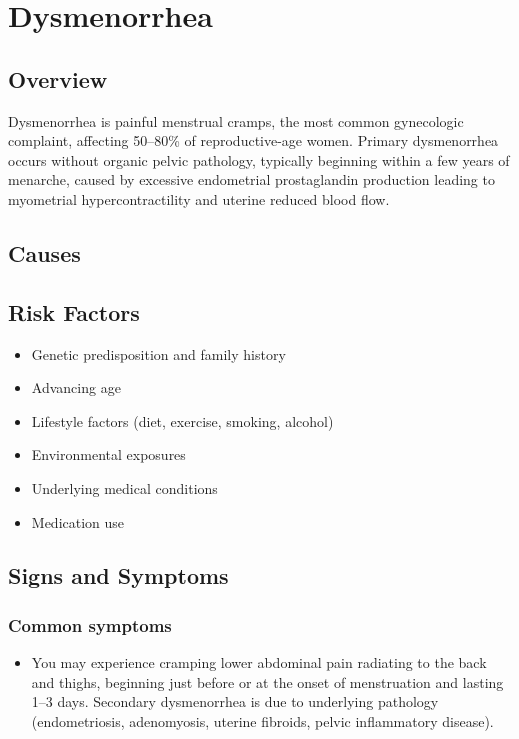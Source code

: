 \chapter{Dysmenorrhea}
\label{sec:Dysmenorrhea}

\section{Overview}
Dysmenorrhea is painful menstrual cramps, the most common gynecologic complaint, affecting 50--80\% of reproductive-age women. Primary dysmenorrhea occurs without organic pelvic pathology, typically beginning within a few years of menarche, caused by excessive endometrial prostaglandin production leading to myometrial hypercontractility and uterine reduced blood flow.
\section{Causes}
\section{Risk Factors}

\begin{itemize}[noitemsep]
  \item Genetic predisposition and family history
  \item Advancing age
  \item Lifestyle factors (diet, exercise, smoking, alcohol)
  \item Environmental exposures
  \item Underlying medical conditions
  \item Medication use
\end{itemize}
\section{Signs and Symptoms}

\subsection{Common symptoms}
\begin{itemize}[noitemsep]
  \item You may experience cramping lower abdominal pain radiating to the back and thighs, beginning just before or at the onset of menstruation and lasting 1--3 days. Secondary dysmenorrhea is due to underlying pathology (endometriosis, adenomyosis, uterine fibroids, pelvic inflammatory disease). 
  \end{itemize}

